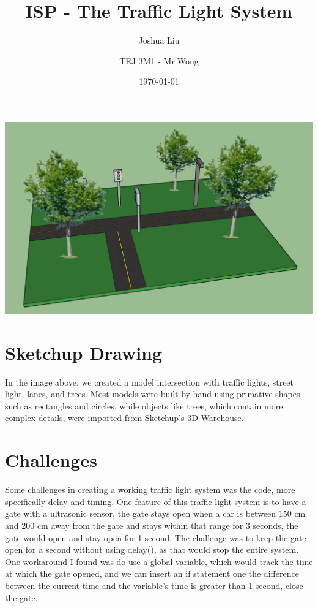 \documentclass[12pt]{article}
\title{ISP - The Traffic Light System}
\author{Joshua Liu}
\author{TEJ 3M1 - Mr.Wong}
\date{\today}
\begin{document}
\maketitle
\begin{center}
    \includegraphics[scale=0.3]{Sketchup.PNG}
\end{center}

\section{Sketchup Drawing}

In the image above, we created a model intersection with traffic lights, street light, lanes, and trees. Most models were built by hand using primative shapes such as rectangles and circles, while objects like trees, which contain more complex details, were imported from Sketchup's 3D Warehouse.

\section{Challenges}

Some challenges in creating a working traffic light system was the code, more specifically delay and timing. One feature of this traffic light system is to have a gate with a ultrasonic sensor, the gate stays open when a car is between 150 cm and 200 cm away from the gate and stays within that range for 3 seconds, the gate would open and stay open for 1 second. The challenge was to keep the gate open for a second without using delay(), as that would stop the entire system. One workaround I found was do use a global variable, which would track the time at which the gate opened, and we can insert an if statement one the difference between the current time and the variable's time is greater than 1 second, close the gate.
\end{document}
